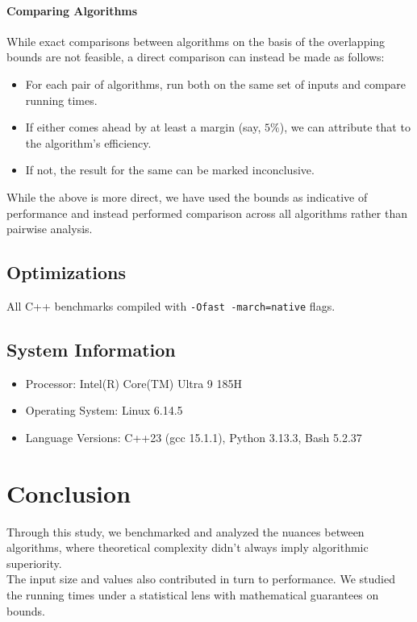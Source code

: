 \documentclass[12pt]{article}
\begin{document}
\paragraph{Comparing Algorithms}
While exact comparisons between algorithms on the basis of the overlapping bounds are not feasible, a direct comparison can instead be made as follows:
\begin{itemize}
    \item For each pair of algorithms, run both on the same set of inputs and compare running times.
    \item If either comes ahead by at least a margin (say, $5\%$), we can attribute that to the algorithm's efficiency.
    \item If not, the result for the same can be marked inconclusive.
\end{itemize}
While the above is more direct, we have used the bounds as indicative of performance and instead performed comparison across all algorithms rather than pairwise analysis.

\subsection{Optimizations}
All C++ benchmarks compiled with \texttt{-Ofast -march=native} flags.

\subsection{System Information}
\begin{itemize}
  \item Processor: Intel(R) Core(TM) Ultra 9 185H
  \item Operating System: Linux 6.14.5
  \item Language Versions: C++23 (gcc 15.1.1), Python 3.13.3, Bash 5.2.37
\end{itemize}

\section{Conclusion}
Through this study, we benchmarked and analyzed the nuances between algorithms, where theoretical complexity didn't always imply algorithmic superiority. \\
The input size and values also contributed in turn to performance. We studied the running times under a statistical lens with mathematical guarantees on bounds. \\
\end{document}
